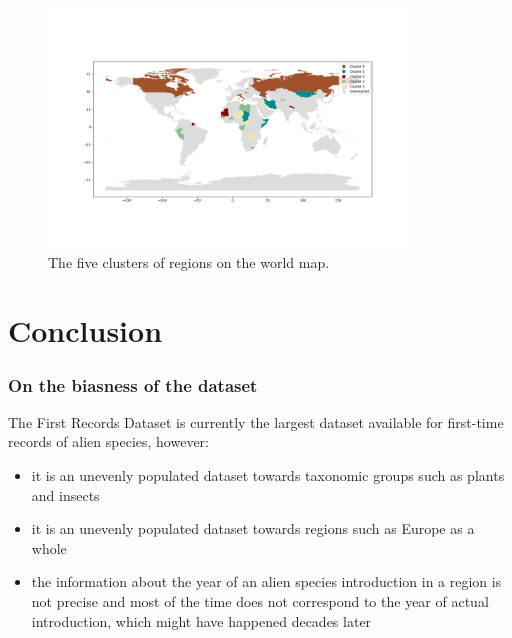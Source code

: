 \documentclass[
	11pt, %
]{beamer}
\begin{document}
\begin{frame}
\begin{figure}[ht]
    \centering
    \includegraphics[width=0.85\textwidth]{region_geospatial_cluster.png}
    \caption{The five clusters of regions on the world map.}
    \label{fig:worldmap_cluster}
\end{figure}
\end{frame}


\section{Conclusion}

\begin{frame}
\frametitle{On the biasness of the dataset}


The First Records Dataset is currently the largest dataset available for first-time records of alien species, however:

\begin{itemize}
\item it is  an unevenly populated dataset towards taxonomic groups such as plants and insects
\item it is an unevenly populated dataset towards regions such as Europe as a whole
\item the information about the year of an alien species introduction in a region is not precise and most of the time does not correspond to the year of actual introduction, which might have happened decades later
\end{itemize}
\end{frame}
\end{document}
